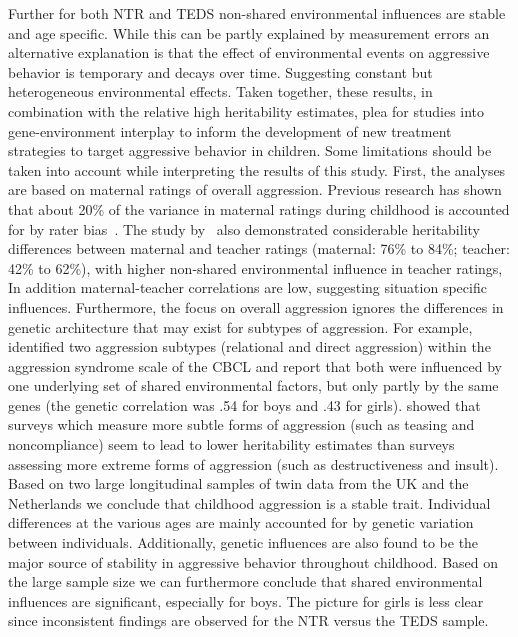 Further for both NTR and TEDS non-shared environmental influences are stable and age specific.
While this can be partly explained by measurement errors an alternative explanation is that the effect of environmental events on aggressive behavior is temporary and decays over time.
Suggesting constant but heterogeneous environmental effects.
Taken together, these results, in combination with the relative high heritability estimates, plea for studies into gene-environment interplay to inform the development of new treatment strategies	to target aggressive behavior in children.
Some limitations should be taken into account while interpreting the results of this study.  First, the analyses are based on maternal ratings of overall aggression.
Previous research has shown that about 20\% of the variance in maternal ratings during childhood is accounted for by rater bias~\cite{Bartels2007}.
The study by~\citet{Haberstick2006} also demonstrated considerable heritability differences between maternal and teacher ratings (maternal: 76\% to 84\%; teacher: 42\% to 62\%), with higher non-shared environmental influence in teacher ratings, In addition maternal-teacher correlations are low, suggesting situation specific influences.
Furthermore, the focus on overall aggression ignores the differences in genetic architecture that may exist for subtypes of aggression.
For example,~\citet{Ligthart2005} identified two aggression subtypes (relational and direct aggression) within the aggression syndrome scale of the CBCL and report that both were influenced by one underlying set of shared environmental factors, but only partly by the same genes (the genetic correlation was .54 for boys and .43 for girls).
\citet{Ghodsian-Carpey1987} showed that surveys which measure more subtle forms of aggression (such as teasing and noncompliance) seem to lead to lower heritability estimates than surveys assessing more extreme forms of aggression (such as destructiveness and insult).
Based on two large longitudinal samples of twin data from the UK and the Netherlands we conclude that childhood aggression is a stable trait.
Individual differences at the various ages are mainly accounted for by genetic variation between individuals.
Additionally, genetic influences are also found to be the major source of stability in aggressive behavior throughout childhood.
Based on the large sample size we can furthermore conclude that shared environmental influences are significant, especially for boys.
The picture for girls is less clear since inconsistent findings are observed for the NTR versus the TEDS sample.
